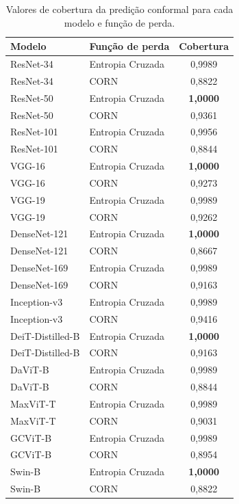 \begin{table}[!htbp]
    \centering
    \caption{Valores de cobertura da predição conformal para cada modelo e função de perda.}
    \label{tab:conformal_coverage}
    \begin{tabular}{|l|l|c|}
        \hline
        \textbf{Modelo} & \textbf{Função de perda} & \textbf{Cobertura} \\
        \hline
        ResNet-34 & Entropia Cruzada &    0,9989 \\
        \hline
        ResNet-34 & CORN &    0,8822 \\
        \hline
        ResNet-50 & Entropia Cruzada &    \textbf{1,0000} \\
        \hline
        ResNet-50 & CORN &    0,9361 \\
        \hline
        ResNet-101 & Entropia Cruzada &    0,9956 \\
        \hline
        ResNet-101 & CORN &    0,8844 \\
        \hline
        VGG-16 & Entropia Cruzada &    \textbf{1,0000} \\
        \hline
        VGG-16 & CORN &    0,9273 \\
        \hline
        VGG-19 & Entropia Cruzada &    0,9989 \\
        \hline
        VGG-19 & CORN &    0,9262 \\
        \hline
        DenseNet-121 & Entropia Cruzada &    \textbf{1,0000} \\
        \hline
        DenseNet-121 & CORN &    0,8667 \\
        \hline
        DenseNet-169 & Entropia Cruzada &    0,9989 \\
        \hline
        DenseNet-169 & CORN &    0,9163 \\
        \hline
        Inception-v3 & Entropia Cruzada &    0,9989 \\
        \hline
        Inception-v3 & CORN &    0,9416 \\
        \hline
        DeiT-Distilled-B & Entropia Cruzada &    \textbf{1,0000} \\
        \hline
        DeiT-Distilled-B & CORN &    0,9163 \\
        \hline
        DaViT-B & Entropia Cruzada &    0,9989 \\
        \hline
        DaViT-B & CORN &    0,8844 \\
        \hline
        MaxViT-T & Entropia Cruzada &    0,9989 \\
        \hline
        MaxViT-T & CORN &    0,9031 \\
        \hline
        GCViT-B & Entropia Cruzada &    0,9989 \\
        \hline
        GCViT-B & CORN &    0,8954 \\
        \hline
        Swin-B & Entropia Cruzada &    \textbf{1,0000} \\
        \hline
        Swin-B & CORN &    0,8822 \\
        \hline
    \end{tabular}
\end{table}

